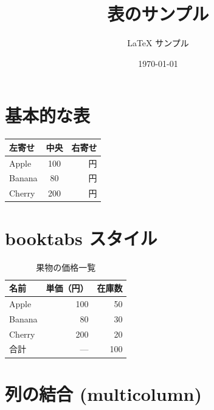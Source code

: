 \documentclass[lualatex,ja=standard]{bxjsarticle}
\title{表のサンプル}
\author{LaTeX サンプル}
\date{\today}
\begin{document}
\maketitle

\section{基本的な表}

\begin{tabular}{|l|c|r|}
  \hline
  左寄せ & 中央 & 右寄せ \\
  \hline
  Apple  & 100  & 円 \\
  Banana &  80  & 円 \\
  Cherry & 200  & 円 \\
  \hline
\end{tabular}

\section{booktabs スタイル}

\begin{table}[h]
  \centering
  \caption{果物の価格一覧}
  \begin{tabular}{lrr}
    \toprule
    名前    & 単価（円） & 在庫数 \\
    \midrule
    Apple   & 100        & 50 \\
    Banana  &  80        & 30 \\
    Cherry  & 200        & 20 \\
    \midrule
    合計    & ---        & 100 \\
    \bottomrule
  \end{tabular}
  \label{tab:fruits}
\end{table}

\section{列の結合 (multicolumn)}
\end{document}
